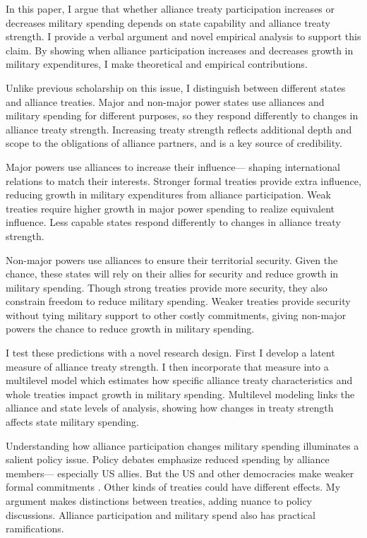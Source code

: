 \documentclass[12pt]{article}
\begin{document}
In this paper, I argue that whether alliance treaty participation increases or decreases military spending depends on state capability and alliance treaty strength.  
I provide a verbal argument and novel empirical analysis to support this claim.
By showing when alliance participation increases and decreases growth in military expenditures, I make theoretical and empirical contributions. 


Unlike previous scholarship on this issue, I distinguish between different states and alliance treaties.  
Major and non-major power states use alliances and military spending for different purposes, so they respond differently to changes in alliance treaty strength.
Increasing treaty strength reflects additional depth and scope to the obligations of alliance partners, and is a key source of credibility. 


Major powers use alliances to increase their influence--- shaping international relations to match their interests. 
Stronger formal treaties provide extra influence, reducing growth in military expenditures from alliance participation. 
Weak treaties require higher growth in major power spending to realize equivalent influence. 
Less capable states respond differently to changes in alliance treaty strength. 


Non-major powers use alliances to ensure their territorial security.
Given the chance, these states will rely on their allies for security and reduce growth in military spending.   
Though strong treaties provide more security, they also constrain freedom to reduce military spending. 
Weaker treaties provide security without tying military support to other costly commitments, giving non-major powers the chance to reduce growth in military spending. 


I test these predictions with a novel research design.
First I develop a latent measure of alliance treaty strength. 
I then incorporate that measure into a multilevel model which estimates how specific alliance treaty characteristics and whole treaties impact growth in military spending.
Multilevel modeling links the alliance and state levels of analysis, showing how changes in treaty strength affects state military spending. 


Understanding how alliance participation changes military spending illuminates a salient policy issue.
Policy debates emphasize reduced spending by alliance members--- especially US allies. 
But the US and other democracies make weaker formal commitments \citep{Chibaetal2015}.
Other kinds of treaties could have different effects. 
My argument makes distinctions between treaties, adding nuance to policy discussions. 
Alliance participation and military spend also has practical ramifications. 
\end{document}
